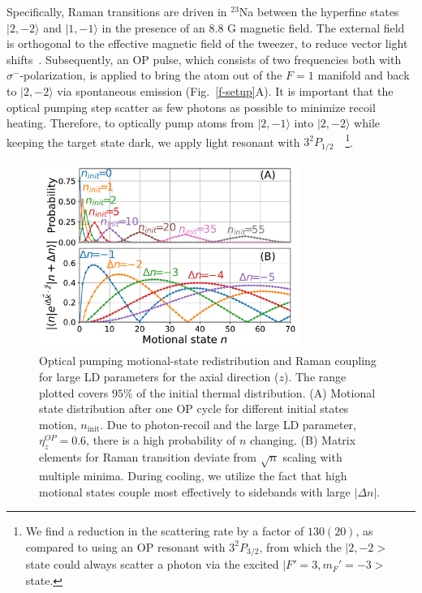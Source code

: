 \documentclass[aps,prl,twocolumn,groupedaddress]{revtex4-1}
\begin{document}
Specifically, Raman transitions are driven in $^{23}$Na between the hyperfine states
$|2, -2\rangle$ and $|1, -1\rangle$ in the presence of an $8.8$ G magnetic field. The external field is
orthogonal to the effective magnetic field of the tweezer, to reduce  vector light shifts~\cite{Kaufman2012,Thompson2013}.
Subsequently, an OP pulse, which consists of two frequencies  both with $\sigma^-$-polarization, is applied  to bring the atom out of the $F=1$ manifold and back to  $|2, -2\rangle$ via spontaneous emission (Fig.~\ref{f-setup}A).
It is important that the optical pumping step scatter as few photons as possible to minimize recoil heating. %
Therefore, to optically pump atoms from $|2,-1\rangle$ into $|2, -2\rangle$ while keeping the target state dark, we apply light resonant with  $3^2P_{1/2}$~\cite{Monroe1995, Grobner2017}~\footnote{We find a reduction in the scattering rate by a factor of $130(20)$, as compared to using an OP resonant with $3^2P_{3/2}$, from which the $|2, -2>$ state could always scatter a photon via the excited $|F'=3, m_F'=-3>$ state.}.

\begin{figure}[b]
  \includegraphics[width=8.5cm]{imgs/fig2_raman_op.pdf}
  \caption{Optical pumping motional-state redistribution and  Raman coupling for large  LD parameters for the axial direction ($z$). The range plotted covers $95$\% of the initial thermal distribution.
    (A) Motional state distribution %
    after one OP cycle
    for different initial states motion, $n_{\textrm{init}}$. Due to photon-recoil and the large LD parameter, $\eta^{OP}_z=0.6$,
    there is a high  probability of $n$ changing.         (B) Matrix elements for Raman transition deviate from
    $\sqrt{n}$ scaling with multiple minima. During cooling, we utilize the fact that high motional states couple most effectively to sidebands with large $|\Delta n|$.
    \label{f-ld}}
\end{figure}
\end{document}
